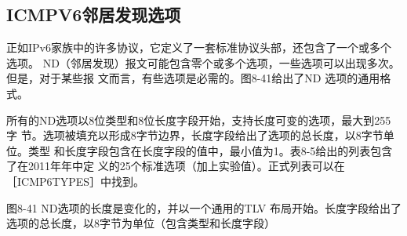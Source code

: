 \subsection{ICMPV6邻居发现选项}
正如IPv6家族中的许多协议，它定义了一套标准协议头部，还包含了一个或多个选项。
ND（邻居发现）报文可能包含零个或多个选项，一些选项可以出现多次。但是，对于某些报
文而言，有些选项是必需的。图8-41给出了ND 选项的通用格式。

所有的ND选项以8位类型和8位长度字段开始，支持长度可变的选项，最大到255字
节。选项被填充以形成8字节边界，长度字段给出了选项的总长度，以8字节单位。类型
和长度字段包含在长度字段的值中，最小值为1。表8-5给出的列表包含了在2011年年中定
义的25个标准选项（加上实验值）。正式列表可以在［ICMP6TYPES］中找到。

图8-41 ND选项的长度是变化的，并以一个通用的TLV 布局开始。长度字段给出了
选项的总长度，以8字节为单位（包含类型和长度字段）

